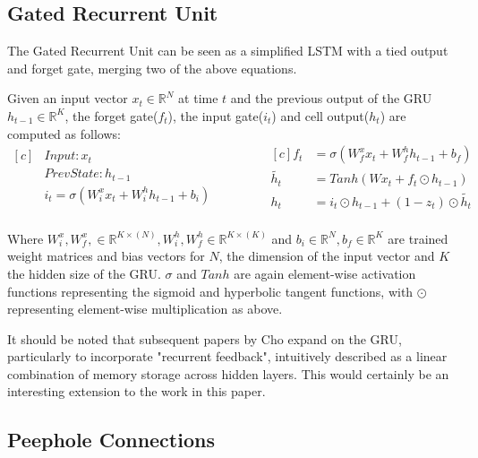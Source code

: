 \documentclass{article} %
\begin{document}
\subsection{Gated Recurrent Unit}
\label{sec:nn/gru}

The Gated Recurrent Unit\cite{DBLP:journals/corr/ChungGCB15} can be seen as a simplified LSTM with a tied output and forget gate, merging two of the above equations. 

Given an input vector $x_{t} \in \mathbb{R}^{N}$ at time $t$ and the previous output of the GRU $h_{t-1} \in \mathbb{R}^{K}$, the forget gate($f_{t}$), the input gate($i_{t}$) and cell output($h_{t}$)  are computed as follows:
\begin{equation}
\begin{aligned}[c]
         &Input: x_{t}  \\
         &Prev State: h_{t-1} \\
    	 &i_{t} = \sigma(W_{i}^{x}x_{t} + W_{i}^{h} h_{t-1} + b_{i})\\
    \end{aligned}
    \qquad \qquad
    \begin{aligned}[c]
    f_{t} &= \sigma(W_{f}^{x}x_{t} + W_{f}^{h} h_{t-1} + b_{f})\\
    \tilde{h_{t}} &= Tanh(W x_{t} + f_{t} \odot h_{t-1})\\
    h_{t} &= i_{t} \odot h_{t-1} + (1- z_{t}) \odot \tilde{h_t}  \\
    \end{aligned}
\end{equation}

Where $W_{i}^{x}, W_{f}^{x}, \in \mathbb{R}^{K \times(N)}, W_{i}^{h}, W_{f}^{h} \in \mathbb{R}^{K \times(K)}$ and $b_{i} \in \mathbb{R}^{N}, b_{f} \in \mathbb{R}^{K}$ are trained weight matrices and bias vectors for $N$, the dimension of the input vector and $K$ the hidden size of the GRU. $\sigma$ and $Tanh$ are again element-wise activation functions representing the sigmoid and hyperbolic tangent functions, with $\odot$ representing element-wise multiplication as above. 

It should be noted that subsequent papers by Cho expand on the GRU, particularly to incorporate "recurrent feedback", intuitively described as a linear combination of memory storage across hidden layers. This would certainly be an interesting extension to the work in this paper.


\subsection{Peephole Connections}
\label{sec:nn/peephole}
\end{document}
